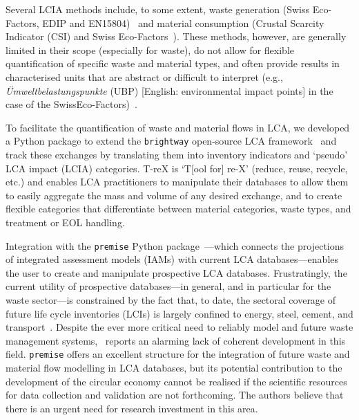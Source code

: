 \documentclass[a4paper,fleqn]{cas-dc}
\begin{document}
Several LCIA methods include, to some extent, waste generation (Swiss Eco-Factors, EDIP and EN15804)~\citep{foen2021ecofactors,hauschild2003edip,cen2019en15804} and material consumption (Crustal Scarcity Indicator (CSI) and Swiss Eco-Factors~\citep{arvidsson2020csi,foen2021ecofactors}). These methods, however, are generally limited in their scope (especially for waste), do not allow for flexible quantification of specific waste and material types, and often provide results in characterised units that are abstract or difficult to
interpret (e.g., \textit{Ümweltbelastungspunkte} (UBP) [English: environmental impact points] in the case of the SwissEco-Factors)~\citep{su2020sustainableproddev}.

To facilitate the quantification of waste and material flows in LCA, we
developed a Python package to extend the \texttt{brightway} open-source LCA
framework~\citep{mutel2017brightway} and track these exchanges by translating
them into inventory indicators and `pseudo' LCA impact (LCIA) categories. T-reX
is `T[ool for] re-X' (reduce, reuse, recycle, etc.) and enables LCA
practitioners to manipulate their databases to allow them to easily aggregate
the mass and volume of any desired exchange, and to create flexible categories
that differentiate between material categories, waste types, and treatment or
EOL handling.

Integration with the \texttt{premise} Python
package~\citep{sacchi2022premise}---which connects the projections of
integrated assessment models (IAMs) with current LCA databases---enables the
user to create and manipulate prospective LCA databases. Frustratingly, the
current utility of prospective databases---in general, and in particular for
the waste sector---is constrained by the fact that, to date, the sectoral
coverage of future life cycle inventories (LCIs) is largely confined to energy,
steel, cement, and transport~\citep{sacchi2023premisedocs}. Despite the ever
more critical need to reliably model and future waste management
systems,~\cite{bisinella2024wastelca} reports an alarming lack of coherent
development in this field. \texttt{premise} offers an excellent structure for
the integration of future waste and material flow modelling in LCA databases,
but its potential contribution to the development of the circular economy
cannot be realised if the scientific resources for data collection and
validation are not forthcoming. The authors believe that there is an urgent
need for research investment in this area.
\end{document}
